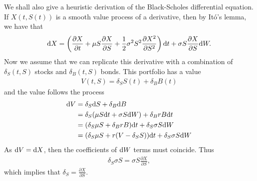We shall also give a heuristic derivation of the Black-Scholes differential equation. If $X(t,S(t))$ is a smooth value process of a derivative, then by It\'{o}'s lemma, we have that
  \begin{align}
    \label{itolemmatoderivateinblackscholes}
    \mathrm{d} X = \left( \frac{\partial X}{\partial t} + \mu S \frac{\partial X}{\partial S} + \frac{1}{2} \sigma^2 S^2 \frac{\partial X^2}{\partial S^2} \right) \mathrm{d} t + \sigma S \frac{\partial X}{\partial S} \mathrm{d} W .
  \end{align}
Now we assume that we can replicate this derivative with a combination of $\delta_S(t,S)$ stocks and $\delta_B(t,S)$ bonds. This portfolio has a value 
	\begin{align}
		V(t,S) = \delta_S S(t) + \delta_B B(t)
	\end{align}
and the value follows the process
	\begin{align}
		\mathrm{d} V &= \delta_S \mathrm{d} S + \delta_B \mathrm{d} B \\
			&= \delta_S (\mu S \mathrm{d} t + \sigma S \mathrm{d} W ) + \delta_B r B \mathrm{d} t \\
			&= (\delta_S \mu S + \delta_B rB) \mathrm{d} t + \delta_S \sigma S \mathrm{d} W \\
			&= (\delta_S \mu S + r (V - \delta_S S)) \mathrm{d} t + \delta_S \sigma S \mathrm{d} W
	\end{align}
As $\mathrm{d} V = \mathrm{d} X$, then the coefficients of $\mathrm{d} W$ terms must coincide. Thus
	\begin{align}
		\label{replicating_delta}
		\delta_S \sigma S = \sigma S \frac{\partial X}{\partial S},  		
	\end{align}
which implies that $\delta_S = \frac{\partial X}{\partial S}$.

